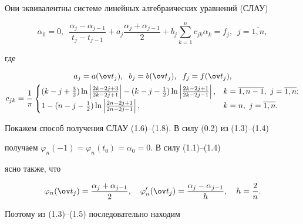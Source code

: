 Они эквивалентны системе линейных алгебраических уравнений (СЛАУ)


\begin{equation}


\alpha_0=0,\ \; \frac{\alpha_j-\alpha_{j-1}}{t_j-t_{j-1}}+a_j\frac


{\alpha_j+\alpha_{j-1}}{2}+b_j\sum_{k=1}^{n}c_{jk}\alpha_k=f_j,\ \;


j=\overline{1,n},


\end{equation}


где 


\begin{gather}


a_j=a(\ov t_j),\ \; b_j=b(\ov t_j),\ \; f_j=f(\ov t_j), \\


%


c_{jk}=\frac{1}{\pi}


\begin{cases}


(k-j+\frac{3}{2})\ln\left|\frac{2k-2j+3}{2k-2j+1}\right|-


(k-j-\frac{1}{2})\ln\left|\frac{2k-2j+1}{2k-2j-1}\right|, & 


k=\overline{1,n-1},\ j=\overline{1,n};\\


1-(n-j-\frac{1}{2})\ln\left|\frac{2n-2j+1}{2n-2j-1}\right|, &  


k=n,\ j=\overline{1,n}.


\end{cases}


\end{gather}





Покажем способ получения СЛАУ (1.6)--(1.8). В силу (0.2) из (1.3)--(1.4)


получаем $\varphi_n(-1)=\varphi_n(t_0)=\alpha_0=0$. В силу (1.1)--(1.4)


ясно также, что


\begin{equation}


\varphi_n(\ov t_j)=\frac{\alpha_j+\alpha_{j-1}}{2},\quad \varphi'_n(


\ov t_j)=\frac{\alpha_j-\alpha_{j-1}}{h},\quad h=\frac{2}{n}.


\end{equation}


Поэтому из (1.3)--(1.5) последовательно находим


